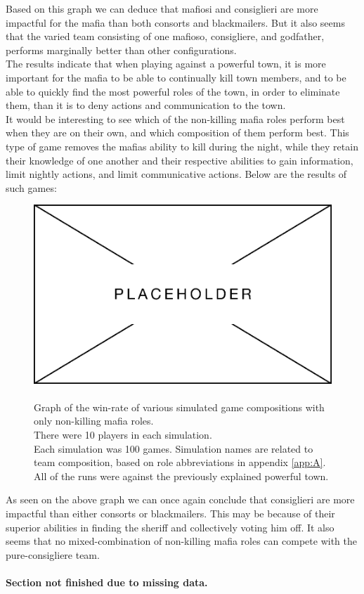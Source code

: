 \vspace{-5px}Based on this graph we can deduce that mafiosi and 
consiglieri are more
impactful for the mafia than both consorts and blackmailers. But it also seems
that the varied team consisting of one mafioso, consigliere, and godfather,
performs marginally better than other configurations. \\
The results indicate that when playing against a powerful town, it is more
important for the mafia to be able to continually kill town members, and to be
able to quickly find the most powerful roles of the town, in order to eliminate
them, than it is to deny actions and communication to the town. \\
It would be interesting to see which of the non-killing mafia roles perform 
best when they are on their own, and which composition of them perform best. 
This type of game removes the mafias ability to kill during the night, while 
they retain their knowledge of one another and their respective abilities to 
gain information, limit nightly actions, and limit communicative actions. Below 
are the results of such games: 
\begin{figure}[H]
	\includegraphics[width=1\linewidth]{figures/placeholder}
	\caption{\\Graph of the win-rate of various simulated game compositions 
	with only non-killing mafia roles.\\
		There were 10 players in each simulation.\\
		Each simulation was 100 games.
		Simulation names are related to team composition, based on role
		abbreviations in appendix \ref{app:A}.\\
		All of the runs were against the previously explained powerful town.}
	\label{fig:VariousSimulationsNonKilling}
\end{figure}
\vspace{-5px} As seen on the above graph we can once again conclude that 
consiglieri are more impactful than either consorts or blackmailers. This may 
be because of their superior abilities in finding the sheriff and collectively 
voting him off. It also seems that no mixed-combination of non-killing mafia 
roles can compete with the pure-consigliere team. \\\\
\textbf{Section not finished due to missing data.}
